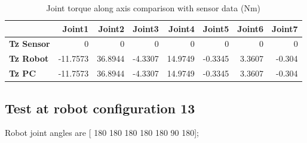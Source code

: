 \begin{table}[h!]
	\centering
	\caption{Joint torque along axis comparison with sensor data (Nm)}
	\label{wrech_Sensor_Pose12}
	\begin{tabular}{|l|r|r|r|r|r|r|r|}
		\hline
		\textbf{} & \textbf{Joint1} & \textbf{Joint2} & \textbf{Joint3} & \textbf{Joint4} & \textbf{Joint5} & \textbf{Joint6} & \textbf{Joint7} \\ \hline
		\textbf{Tz Sensor}  & 0           & 0           & 0            & 0           & 0           & 0           & 0           \\ \hline
		\textbf{Tz Robot}  	& -11.7573           & 36.8944           & -4.3307            & 14.9749           & -0.3345           & 3.3607           & -0.304           \\ \hline
		\textbf{Tz PC}  	& -11.7573           & 36.8944           & -4.3307            & 14.9749           & -0.3345           & 3.3607           & -0.304           \\ \hline
	\end{tabular}
\end{table}


\subsection{Test at robot configuration 13}
Robot joint angles are  [ 180  180  180  180  180   90  180];

